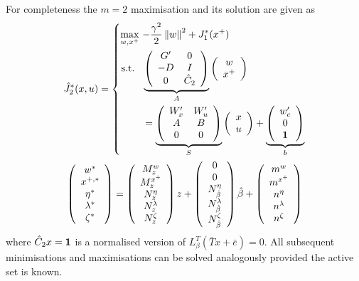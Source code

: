 \documentclass{ifacconf}
\providecommand{\norm}[1]{\left\|#1\right\|}
\begin{document}
For completeness the $m=2$ maximisation and its solution are given as
\begin{gather*}
	\hat J_2^\ast(x,u) = \left\{\begin{split}
	\max_{w,x^+} \ & {-\frac{\gamma^2}{2}}\norm{w}^2 + J_{1}^\ast(x^+)\\
	\text{s.t. }\ & 
	\underbrace{\left(\begin{array}{cc}
	G^\prime & 0 \\ -D & I \\
	0 & \hat C_2
	\end{array}\right)}_{\bar A}
	\left(\begin{array}{c}w\\ x^+\end{array}\right)
	\\&= \underbrace{\left(\begin{array}{cc}W_x^\prime & W_u^\prime \\ A & B \\ 0 & 0\end{array}\right)}_{
	\bar S
	}
	\left(\begin{array}{c}x \\ u \end{array}\right) + \underbrace{\left(\begin{array}{c}
	w_c^\prime \\ 0 \\ {\bf{1}}\end{array}\right)}_{\bar b}
	\end{split}\right.
\\
	\left(\begin{array}{c}
	w^\ast \\
	x^{+,\ast} \\
	\eta^\ast \\
	\lambda^\ast\\
	\zeta^\ast
	\end{array}\right) = \left(\begin{array}{c}M^w_z\\ M^{x^+}_z \\ N^{\eta}_z \\ N^{\lambda}_z \\ N^{\zeta}_z
	\end{array}\right)z + 
	\left(\begin{array}{c}0\\ 0 \\ N^{\eta}_{\hat\beta} \\ N^{\lambda}_{\hat\beta} \\ N^\zeta_{\hat\beta}
	\end{array}\right)\hat\beta + \left(\begin{array}{c}m^w\\ m^{x^+} \\ n^{\eta} \\ n^{\lambda}\\ n^\zeta
	\end{array}\right)
\end{gather*}
where $\hat C_2 x = {\bf{1}}$ is a normalised version of $L^T_\beta(\bar T x + \bar e) = 0$.
All subsequent minimisations and maximisations can be solved analogously provided the active set is
known.
\end{document}
